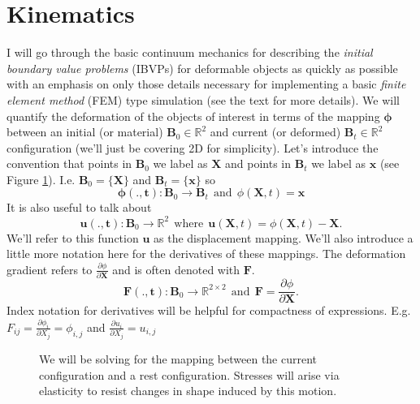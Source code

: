 
\section*{Kinematics}

I will go through the basic continuum mechanics for describing the \emph{initial boundary value problems} (IBVPs) for deformable objects as quickly as possible with an emphasis on only those details necessary for implementing a basic \emph{finite element method} (FEM) type simulation (see the text \cite{BW08} for more details). We will quantify the deformation of the objects of interest in terms of the mapping $\mathbf{\phi}$ between an initial (or material) $\mathbf{B}_0\in\mathbb{R}^2$ and current (or deformed) $\mathbf{B}_t\in\mathbb{R}^2$ configuration (we'll just be covering 2D for simplicity). Let's introduce the convention that points in $\mathbf{B}_0$ we label as $\mathbf{X}$ and points in $\mathbf{B}_t$ we label as $\mathbf{x}$ (see Figure \ref{fig:phi}). I.e. $\mathbf{B}_0=\{\mathbf{X}\}$ and $\mathbf{B}_t=\{\mathbf{x}\}$ so
$$
\mathbf{\phi(.,t)}:\mathbf{B}_0\rightarrow\mathbf{B}_t \ \ \textrm{and} \ \ \phi(\mathbf{X},t)=\mathbf{x}
$$
It is also useful to talk about
$$
\mathbf{u(.,t)}:\mathbf{B}_0\rightarrow\mathbb{R}^2\ \ \textrm{where} \ \ \mathbf{u}(\mathbf{X},t)=\phi(\mathbf{X},t)-\mathbf{X}.
$$
We'll refer to this function $\mathbf{u}$ as the displacement mapping. We'll also introduce a little more notation here for the derivatives of these mappings. The deformation gradient refers to $\frac{\partial\phi}{\partial\mathbf{X}}$ and is often denoted with $\mathbf{F}$.
$$
\mathbf{F(.,t)}:\mathbf{B}_0\rightarrow\mathbb{R}^{2\times2}\ \ \textrm{and} \ \ \mathbf{F}=\frac{\partial\phi}{\partial\mathbf{X}}.
$$
Index notation for derivatives will be helpful for compactness of expressions. E.g. $F_{ij}=\frac{\partial\phi_i}{\partial{X}_j}=\phi_{i,j}$ and $\frac{\partial{u}_i}{\partial{X}_j}=u_{i,j}$
\begin{figure}
\caption{We will be solving for the mapping between the current configuration and a rest configuration. Stresses will arise via elasticity to resist changes in shape induced by this motion.}
\label{fig:phi}
\end{figure}
